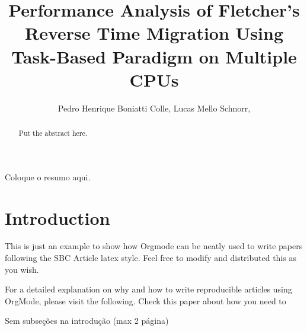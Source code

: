 \documentclass[12pt]{article}
\date{}
\title{Performance Analysis of Fletcher’s Reverse Time Migration Using Task-Based Paradigm on Multiple CPUs}
\begin{document}
\makeatletter
\let\orgtitle\@title
\makeatother

\title{\orgtitle}

\author{
   Pedro Henrique Boniatti Colle,
   Lucas Mello Schnorr,
   }

\address{
   Institute of Informatics, Federal University of Rio Grande do Sul (UFRGS)\\
   Caixa Postal 15.064 -- 91.501-970 -- Porto Alegre -- RS -- Brazil
   }

\maketitle
\begin{abstract}
Put the abstract here.
\end{abstract}

\begin{resumo}
Coloque o resumo aqui.
\end{resumo}
\section{Introduction}
\label{sec:orgd8f5e6a}

This is just an example to show how Orgmode \cite{orgmode} can be
neatly used to write papers following the SBC Article latex style. Feel
free to modify and distributed this as you wish.

For a detailed explanation on why and how to write reproducible
articles using OrgMode, please visit the following. 
Check this paper \cite{schnorr2013visualizing} about how you need to

Sem subseções na introdução (max 2 página)
\end{document}
